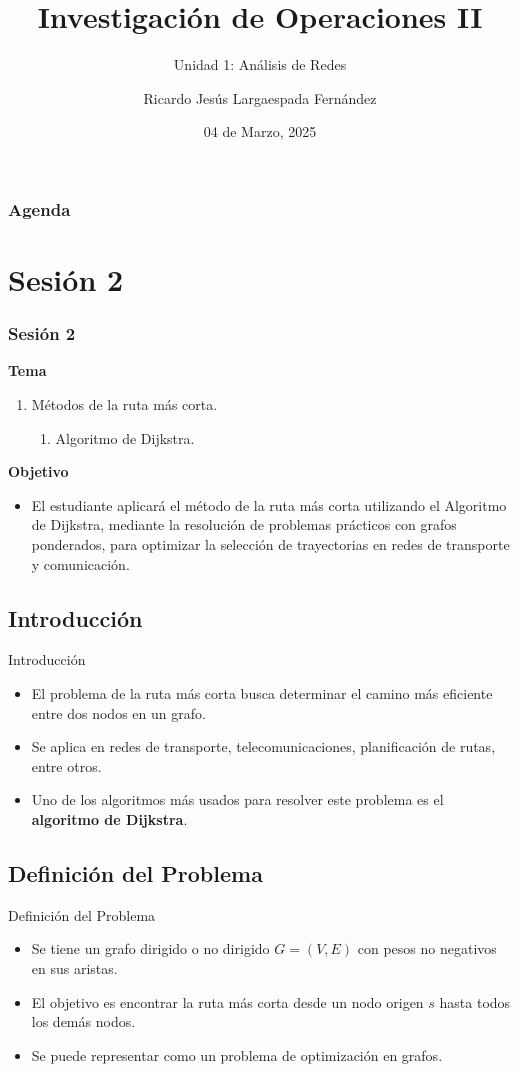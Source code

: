 \documentclass{beamer}
\title{Investigación de Operaciones II}
\subtitle{Unidad 1: Análisis de Redes}
\author{Ricardo Jesús Largaespada Fernández}
\institute{Ingeniería de Sistemas, DACTIC, UNI}
\date{04 de Marzo, 2025}
\begin{document}
\frame{\titlepage}

\begin{frame}
\frametitle{Agenda}
\tableofcontents
\end{frame}

\section{Sesión 2}
\begin{frame}
\frametitle{Sesión 2}

\textbf{Tema}
\begin{enumerate}
\item Métodos de la ruta más corta.
\begin{enumerate}
\item Algoritmo de Dijkstra.
\end{enumerate}
\end{enumerate}
\textbf{Objetivo}
\begin{itemize}
    \item El estudiante aplicará el método de la ruta más corta utilizando el Algoritmo de Dijkstra, mediante la resolución de problemas prácticos con grafos ponderados, para optimizar la selección de trayectorias en redes de transporte y comunicación.
\end{itemize}
\end{frame}

\subsection{Introducción}
\begin{frame}{Introducción}
    \begin{itemize}
        \item El problema de la ruta más corta busca determinar el camino más eficiente entre dos nodos en un grafo.
        \item Se aplica en redes de transporte, telecomunicaciones, planificación de rutas, entre otros.
        \item Uno de los algoritmos más usados para resolver este problema es el \textbf{algoritmo de Dijkstra}.
    \end{itemize}
\end{frame}

\subsection{Definición del Problema}
\begin{frame}{Definición del Problema}
    \begin{itemize}
        \item Se tiene un grafo dirigido o no dirigido $G=(V,E)$ con pesos no negativos en sus aristas.
        \item El objetivo es encontrar la ruta más corta desde un nodo origen $s$ hasta todos los demás nodos.
        \item Se puede representar como un problema de optimización en grafos.
    \end{itemize}
\end{frame}
\end{document}
